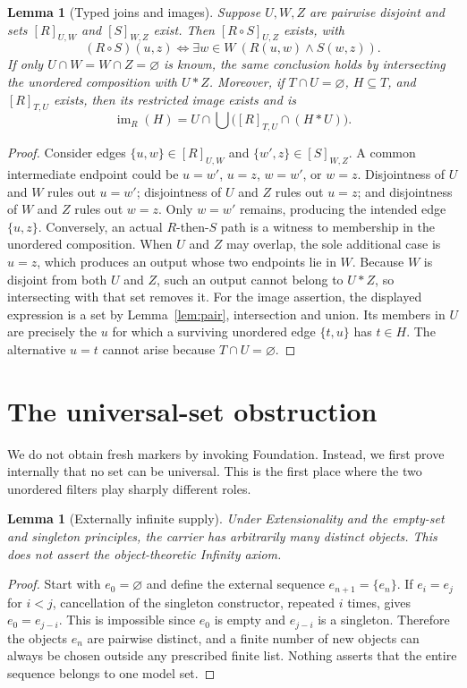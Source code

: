 \documentclass[11pt,a4paper]{article}
\numberwithin{equation}{section}
\newtheorem{lemma}[theorem]{Lemma}
\newcommand{\up}[2]{\{#1,#2\}}
\newcommand{\UnProd}{\mathbin{\ast}}
\begin{document}
\begin{lemma}[Typed joins and images]\label{lem:typed}
Suppose $U,W,Z$ are pairwise disjoint and sets $[R]_{U,W}$ and $[S]_{W,Z}$ exist.  Then $[R\circ S]_{U,Z}$ exists, with
\[
(R\circ S)(u,z)\iff\exists w\in W\ (R(u,w)\land S(w,z)).
\]
If only $U\cap W=W\cap Z=\varnothing$ is known, the same conclusion holds by intersecting the unordered composition with $U\UnProd Z$.  Moreover, if $T\cap U=\varnothing$, $H\subseteq T$, and $[R]_{T,U}$ exists, then its restricted image exists and is
\begin{equation}\label{eq:image}
\operatorname{im}_{R}(H)=U\cap\bigcup\bigl([R]_{T,U}\cap(H\UnProd U)\bigr).
\end{equation}
\end{lemma}
\begin{proof}
Consider edges $\up uw\in[R]_{U,W}$ and $\up{w'}z\in[S]_{W,Z}$.  A common intermediate endpoint could be $u=w'$, $u=z$, $w=w'$, or $w=z$.  Disjointness of $U$ and $W$ rules out $u=w'$; disjointness of $U$ and $Z$ rules out $u=z$; and disjointness of $W$ and $Z$ rules out $w=z$.  Only $w=w'$ remains, producing the intended edge $\up uz$.  Conversely, an actual $R$-then-$S$ path is a witness to membership in the unordered composition.  When $U$ and $Z$ may overlap, the sole additional case is $u=z$, which produces an output whose two endpoints lie in $W$.  Because $W$ is disjoint from both $U$ and $Z$, such an output cannot belong to $U\UnProd Z$, so intersecting with that set removes it.  For the image assertion, the displayed expression is a set by Lemma~\ref{lem:pair}, intersection and union.  Its members in $U$ are precisely the $u$ for which a surviving unordered edge $\up tu$ has $t\in H$.  The alternative $u=t$ cannot arise because $T\cap U=\varnothing$.
\end{proof}

\section{The universal-set obstruction}\label{sec:universal}
We do not obtain fresh markers by invoking Foundation.  Instead, we first prove internally that no set can be universal.  This is the first place where the two unordered filters play sharply different roles.

\begin{lemma}[Externally infinite supply]\label{lem:infinite}
Under Extensionality and the empty-set and singleton principles, the carrier has arbitrarily many distinct objects.  This does not assert the object-theoretic Infinity axiom.
\end{lemma}
\begin{proof}
Start with $e_0=\varnothing$ and define the external sequence $e_{n+1}=\{e_n\}$.  If $e_i=e_j$ for $i<j$, cancellation of the singleton constructor, repeated $i$ times, gives $e_0=e_{j-i}$.  This is impossible since $e_0$ is empty and $e_{j-i}$ is a singleton.  Therefore the objects $e_n$ are pairwise distinct, and a finite number of new objects can always be chosen outside any prescribed finite list.  Nothing asserts that the entire sequence belongs to one model set.
\end{proof}
\end{document}
